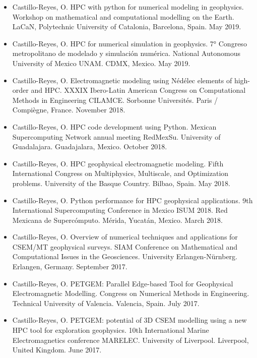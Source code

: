 \documentclass[letterpaper,10pt,english]{sphinxmanual}
\begin{document}
\begin{itemize}
\item {} 
Castillo-Reyes, O. HPC with python for numerical modeling in geophysics. Workshop on mathematical and computational modelling on the Earth. LaCaN, Polytechnic University of Catalonia, Barcelona, Spain. May 2019.

\item {} 
Castillo-Reyes, O. HPC for numerical simulation in geophysics. 7° Congreso metropolitano de modelado y simulación numérica. National Autonomous University of Mexico \textendash{} UNAM. CDMX, Mexico. May 2019.

\item {} 
Castillo-Reyes, O. Electromagnetic modeling using Nédélec elements of high-order and HPC. XXXIX Ibero-Latin American Congress on Computational Methods in Engineering \textendash{} CILAMCE. Sorbonne Universités. Paris / Compiègne, France. November 2018.

\item {} 
Castillo-Reyes, O. HPC code development using Python. Mexican Supercomputing Network annual meeting \textendash{} RedMexSu. University of Guadalajara. Guadajalara, Mexico. October 2018.

\item {} 
Castillo-Reyes, O. HPC geophysical electromagnetic modeling. Fifth International Congress on Multiphysics, Multiscale, and Optimization problems. University of the Basque Country. Bilbao, Spain. May 2018.

\item {} 
Castillo-Reyes, O. Python performance for HPC geophysical applications. 9th International Supercomputing Conference in Mexico \textendash{} ISUM 2018. Red Mexicana de Supercómputo. Mérida, Yucatán, Mexico. March 2018.

\item {} 
Castillo-Reyes, O. Overview of numerical techniques and applications for CSEM/MT geophysical surveys. SIAM Conference on Mathematical and Computational Issues in the Geosciences. University Erlangen-Nürnberg. Erlangen, Germany. September 2017.

\item {} 
Castillo-Reyes, O. PETGEM: Parallel Edge-based Tool for Geophysical Electromagnetic Modelling. Congress on Numerical Methods in Engineering. Technical University of Valencia. Valencia, Spain. July 2017.

\item {} 
Castillo-Reyes, O. PETGEM: potential of 3D CSEM modelling using a new HPC tool for exploration geophysics. 10th International Marine Electromagnetics conference \textendash{} MARELEC. University of Liverpool. Liverpool, United Kingdom. June 2017.


\end{itemize}
\end{document}
